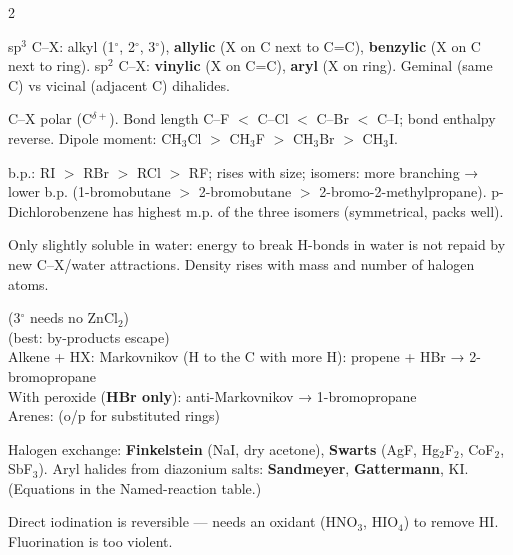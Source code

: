 \documentclass[9pt,a4paper]{extarticle}
\newcommand{\nr}[1]{\textbf{\color{uc!85!black}#1}}
\begin{document}
\begin{multicols}{2}\raggedcolumns
\begin{fl}
\item sp$^3$ C--X: alkyl (1$^\circ$, 2$^\circ$, 3$^\circ$), \textbf{allylic} (X on C next to C=C), \textbf{benzylic} (X on C next to ring). sp$^2$ C--X: \textbf{vinylic} (X on C=C), \textbf{aryl} (X on ring). Geminal (same C) vs vicinal (adjacent C) dihalides.
\item C--X polar (C$^{\delta+}$). Bond length C--F $<$ C--Cl $<$ C--Br $<$ C--I; bond enthalpy reverse. Dipole moment: CH$_3$Cl $>$ CH$_3$F $>$ CH$_3$Br $>$ CH$_3$I.
\item b.p.: RI $>$ RBr $>$ RCl $>$ RF; rises with size; isomers: more branching → lower b.p. (1-bromobutane $>$ 2-bromobutane $>$ 2-bromo-2-methylpropane). p-Dichlorobenzene has highest m.p. of the three isomers (symmetrical, packs well).
\item Only slightly soluble in water: energy to break H-bonds in water is not repaid by new C--X/water attractions. Density rises with mass and number of halogen atoms.
\end{fl}
\begin{kbox}
 (3$^\circ$ needs no ZnCl$_2$)\quad {}\\
\quad {} (best: by-products escape)\\
Alkene + HX: Markovnikov (H to the C with more H): propene + HBr → 2-bromopropane\\
With peroxide (\textbf{HBr only}): anti-Markovnikov → 1-bromopropane\\
Arenes:  (o/p for substituted rings)
\end{kbox}
\begin{fl}
\item Halogen exchange: \nr{Finkelstein} (NaI, dry acetone), \nr{Swarts} (AgF, Hg$_2$F$_2$, CoF$_2$, SbF$_3$). Aryl halides from diazonium salts: \nr{Sandmeyer}, \nr{Gattermann}, KI. (Equations in the Named-reaction table.)
\item Direct iodination is reversible — needs an oxidant (HNO$_3$, HIO$_4$) to remove HI. Fluorination is too violent.
\end{fl}

\end{multicols}
\end{document}
